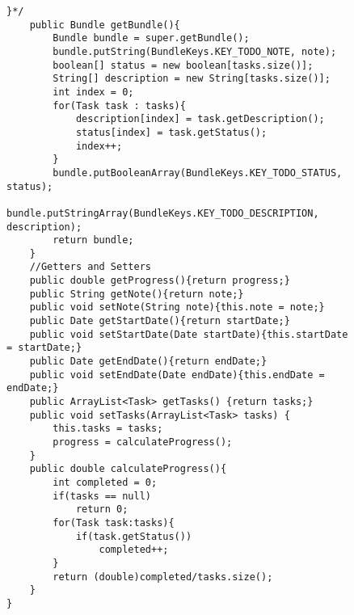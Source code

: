 \begin{figure}[H]
\begin{lstlisting}[caption=Todo (Joscha Nassenstein)]
    }*/
    public Bundle getBundle(){
        Bundle bundle = super.getBundle();
        bundle.putString(BundleKeys.KEY_TODO_NOTE, note);
        boolean[] status = new boolean[tasks.size()];
        String[] description = new String[tasks.size()];
        int index = 0;
        for(Task task : tasks){
            description[index] = task.getDescription();
            status[index] = task.getStatus();
            index++;
        }
        bundle.putBooleanArray(BundleKeys.KEY_TODO_STATUS, status);
        bundle.putStringArray(BundleKeys.KEY_TODO_DESCRIPTION, description);
        return bundle;
    }
    //Getters and Setters
    public double getProgress(){return progress;}
    public String getNote(){return note;}
    public void setNote(String note){this.note = note;}
    public Date getStartDate(){return startDate;}
    public void setStartDate(Date startDate){this.startDate = startDate;}
    public Date getEndDate(){return endDate;}
    public void setEndDate(Date endDate){this.endDate = endDate;}
    public ArrayList<Task> getTasks() {return tasks;}
    public void setTasks(ArrayList<Task> tasks) {
        this.tasks = tasks;
        progress = calculateProgress();
    }
    public double calculateProgress(){
        int completed = 0;
        if(tasks == null)
            return 0;
        for(Task task:tasks){
            if(task.getStatus())
                completed++;
        }
        return (double)completed/tasks.size();
    }
}
\end{lstlisting}
\end{figure}

